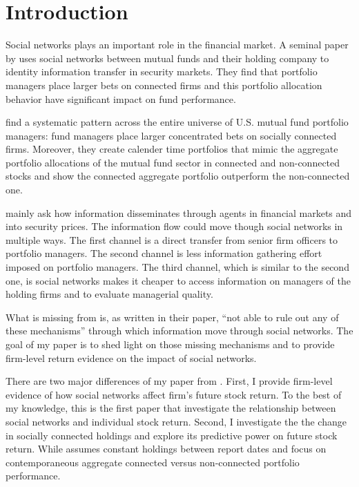 \documentclass[11pt]{article}
\begin{document}
\section{Introduction}
\begin{doublespace}
Social networks plays an important role in the financial market. A seminal paper by \cite{cohen2008small}
 uses social networks between mutual funds and their holding company to identity information transfer in security markets. They find that portfolio managers place larger bets on connected firms and this portfolio allocation behavior have significant impact on fund performance. 

 \cite{cohen2008small} find a systematic pattern across the entire universe of U.S. mutual fund portfolio managers: fund managers place larger concentrated bets on socially connected firms. Moreover, they create calender time portfolios that mimic the aggregate portfolio allocations of the mutual fund sector in connected and non-connected stocks and show the connected aggregate portfolio outperform the non-connected one. 

\cite{cohen2008small} mainly ask how information disseminates through agents in financial markets and into security prices. The information flow could move though social networks in multiple ways. The first channel is a direct transfer from senior firm officers to portfolio managers. The second channel is less information gathering effort imposed on portfolio managers.  The third channel, which is similar to the second one, is social networks makes it cheaper to access information on managers of the holding firms and to evaluate managerial quality. 

What is missing from \cite{cohen2008small} is, as written in their paper, ``not able to rule out any of these mechanisms'' through which information move through social networks. The goal of my paper is to shed light on those missing mechanisms and to provide firm-level return evidence on the impact of social networks. 

There are two major differences of my paper from \cite{cohen2008small}. First, I provide firm-level evidence of how social networks affect firm's future stock return. To the best of my knowledge, this is the first paper that investigate the relationship between social networks and individual stock return. Second, I investigate the the change in socially connected holdings and explore its predictive power on future stock return. While \cite{cohen2008small} assumes constant holdings between report dates and focus on contemporaneous aggregate connected versus non-connected portfolio performance. 


\end{doublespace}
\end{document}
